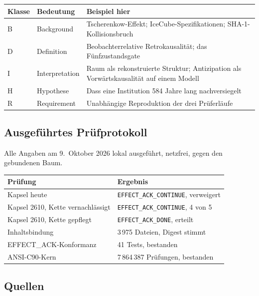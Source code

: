 \documentclass[11pt,a4paper]{article}
\theoremstyle{remark}
\begin{document}
\begin{table}[h]
\centering
\small
\begin{tabularx}{\textwidth}{@{}llX@{}}
\toprule
\textbf{Klasse} & \textbf{Bedeutung} & \textbf{Beispiel hier} \\
\midrule
B & Background & Tscherenkow-Effekt; IceCube-Spezifikationen; SHA-1-Kollisionsbruch \\
D & Definition & Beobachterrelative Retrokausalität; das Fünfzustandsgate \\
I & Interpretation & Raum als rekonstruierte Struktur; Antizipation als Vorwärtskausalität auf einem Modell \\
H & Hypothese & Dass eine Institution 584 Jahre lang nachversiegelt \\
R & Requirement & Unabhängige Reproduktion der drei Prüferläufe \\
\bottomrule
\end{tabularx}
\end{table}

\subsection*{Ausgeführtes Prüfprotokoll}

Alle Angaben am 9.~Oktober 2026 lokal ausgeführt, netzfrei, gegen den
gebundenen Baum.

\begin{table}[h]
\centering
\small
\begin{tabularx}{\textwidth}{@{}Xl@{}}
\toprule
\textbf{Prüfung} & \textbf{Ergebnis} \\
\midrule
Kapsel heute & \texttt{EFFECT\_ACK\_CONTINUE}, verweigert \\
Kapsel 2610, Kette vernachlässigt & \texttt{EFFECT\_ACK\_CONTINUE}, 4 von 5 \\
Kapsel 2610, Kette gepflegt & \texttt{EFFECT\_ACK\_DONE}, erteilt \\
Inhaltsbindung & 3\,975 Dateien, Digest stimmt \\
EFFECT\_ACK-Konformanz & 41 Tests, bestanden \\
ANSI-C90-Kern & 7\,864\,387 Prüfungen, bestanden \\
\bottomrule
\end{tabularx}
\end{table}

\subsection*{Quellen}
\end{document}
